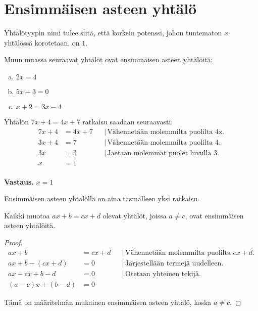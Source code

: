 \chapter{Ensimmäisen asteen yhtälö}


Yhtälötyypin nimi tulee siitä, että korkein potenssi, johon tuntematon $x$
yhtälössä korotetaan, on $1$.

\begin{esimerkki}
Muun muassa seuraavat yhtälöt ovat ensimmäisen asteen yhtälöitä:
\begin{enumerate}[a)]
\item $2x = 4$
\item $5x+3 = 0$
\item $x+2 = 3x-4$
\end{enumerate}
\end{esimerkki}


\begin{esimerkki}
Yhtälön $7x+4=4x+7$ ratkaisu saadaan seuraavasti:
\begin{align*}
7x+4 &= 4x+7 & &| \, \text{Vähennetään molemmilta puolilta 4x.} \\
3x+4 &= 7 & &| \, \text{Vähennetään molemmilta puolilta 4.} \\
3x &= 3 & &| \, \text{Jaetaan molemmat puolet luvulla 3.} \\
x &= 1 & & \\
\end{align*}

\textbf{Vastaus.} $x=1$
\end{esimerkki}

Ensimmäisen asteen yhtälöllä on aina täsmälleen yksi ratkaisu.

\begin{theorem}
Kaikki muotoa $ax+b=cx+d$ olevat yhtälöt, joissa $a \neq c$, ovat ensimmäisen asteen yhtälöitä.
\end{theorem}

\begin{proof}
\begin{align*}
ax+b &= cx+d & &| \, \text{Vähennetään molemmilta puolilta $cx+d$}. \\
ax+b - (cx+d) &= 0 & &| \, \text{Järjestellään termejä uudelleen.} \\
ax - cx + b - d &= 0 & &| \, \text{Otetaan yhteinen tekijä.} \\
(a-c)x + (b-d) &= 0 & &
\end{align*}

Tämä on määritelmän mukainen ensimmäisen asteen yhtälö, koska $a \neq c$.
\end{proof}

